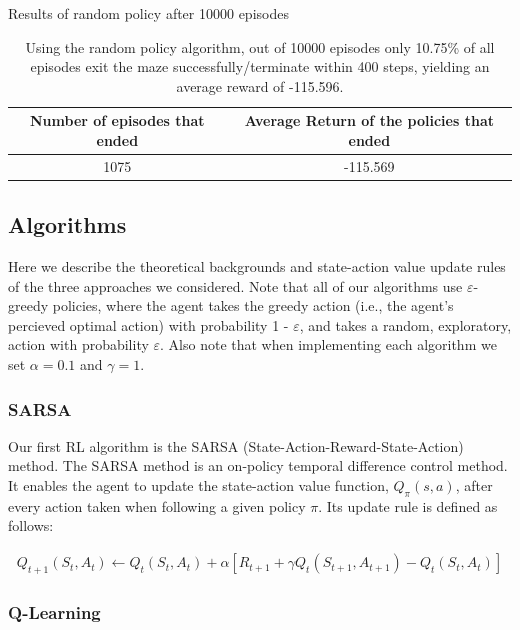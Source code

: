 \documentclass[final,12pt,3p]{elsarticle}
\begin{document}
\begin{table}[H]
    \centering
    \caption{Results of random policy after 10000 episodes}
    \begin{tabular}{|c|c|}
        \hline
        Number of episodes that ended & Average Return of the policies that ended \\ \hline
        1075 & -115.569 \\ \hline
    \end{tabular}
    \caption*{Using the random policy algorithm, out of 10000 episodes only 10.75\% of all episodes exit the maze successfully/terminate within 400 steps, yielding an average reward of -115.596.}
\end{table}

\subsection{Algorithms}
\vspace{12pt}

Here we describe the theoretical backgrounds and state-action value update rules of the three approaches we considered. Note that all of our algorithms use $\varepsilon$-greedy policies, where the agent takes the greedy action (i.e., the agent's percieved optimal action) with probability 1 - $\varepsilon$, and takes a random, exploratory, action with probability $\varepsilon$. Also note that when implementing each algorithm we set $\alpha = 0.1$ and  $\gamma = 1$. 

\subsubsection{SARSA}
\vspace{12pt}

Our first RL algorithm is the SARSA (State-Action-Reward-State-Action) method. The SARSA method is an on-policy temporal difference control method. It enables the agent to update the state-action value function, $Q_{\pi}(s,a)$, after every action taken when following a given policy $\pi$. Its update rule is defined as follows:

\begin{align*}
    Q_{t+1}(S_t,A_t) \leftarrow Q_{t}(S_t,A_t) + \alpha[R_{t+1} + \gamma Q_t(S_{t+1},A_{t+1}) - Q_t(S_t,A_t)]
\end{align*}

\subsubsection{Q-Learning}
\vspace{12pt}
\end{document}
